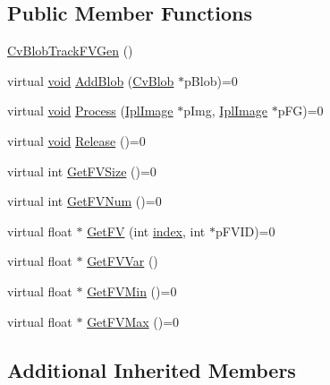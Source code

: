 \subsection*{Public Member Functions}
\begin{DoxyCompactItemize}
\item 
\hyperlink{classCvBlobTrackFVGen_aacb8f8b1e3d3262242d014e4c1653409}{Cv\-Blob\-Track\-F\-V\-Gen} ()
\item 
virtual \hyperlink{legacy_8hpp_a8bb47f092d473522721002c86c13b94e}{void} \hyperlink{classCvBlobTrackFVGen_a59539e9e154f4ee2e649a15b511b3cc7}{Add\-Blob} (\hyperlink{structCvBlob}{Cv\-Blob} $\ast$p\-Blob)=0
\item 
virtual \hyperlink{legacy_8hpp_a8bb47f092d473522721002c86c13b94e}{void} \hyperlink{classCvBlobTrackFVGen_a2766b4ba6230a9a3ebc3c9c878bbb90d}{Process} (\hyperlink{core_2types__c_8h_a249298f383f3b430b476542076320c57}{Ipl\-Image} $\ast$p\-Img, \hyperlink{core_2types__c_8h_a249298f383f3b430b476542076320c57}{Ipl\-Image} $\ast$p\-F\-G)=0
\item 
virtual \hyperlink{legacy_8hpp_a8bb47f092d473522721002c86c13b94e}{void} \hyperlink{classCvBlobTrackFVGen_ae3e0e535d8ac4c4bc2b3eb637b51b891}{Release} ()=0
\item 
virtual int \hyperlink{classCvBlobTrackFVGen_ae842458c3db3f2ff0e1eece58e1c8737}{Get\-F\-V\-Size} ()=0
\item 
virtual int \hyperlink{classCvBlobTrackFVGen_a82b088cbd0c985894e80436fc162ff27}{Get\-F\-V\-Num} ()=0
\item 
virtual float $\ast$ \hyperlink{classCvBlobTrackFVGen_acc59c6a41686c120c72ffc55395b3be2}{Get\-F\-V} (int \hyperlink{core__c_8h_a750b5d744c39a06bfb13e6eb010e35d0}{index}, int $\ast$p\-F\-V\-I\-D)=0
\item 
virtual float $\ast$ \hyperlink{classCvBlobTrackFVGen_ae62c3a07e13381b1776f131ee2710792}{Get\-F\-V\-Var} ()
\item 
virtual float $\ast$ \hyperlink{classCvBlobTrackFVGen_a27629f9e93d40a66f64a6b6b3457d985}{Get\-F\-V\-Min} ()=0
\item 
virtual float $\ast$ \hyperlink{classCvBlobTrackFVGen_a21b27d683121c623ff3794454987e86f}{Get\-F\-V\-Max} ()=0
\end{DoxyCompactItemize}
\subsection*{Additional Inherited Members}


